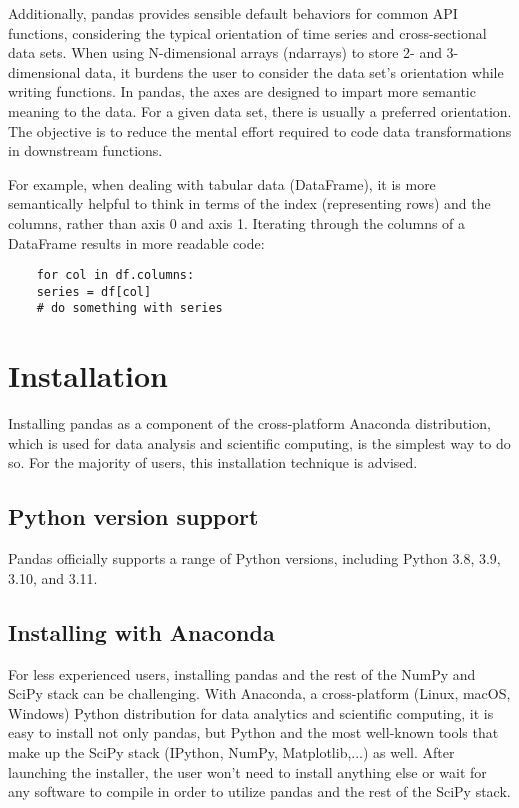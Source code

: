 Additionally, pandas provides sensible default behaviors for common API functions, considering the typical orientation of time series and cross-sectional data sets. When using N-dimensional arrays (ndarrays) to store 2- and 3-dimensional data, it burdens the user to consider the data set's orientation while writing functions. In pandas, the axes are designed to impart more semantic meaning to the data. For a given data set, there is usually a preferred orientation. The objective is to reduce the mental effort required to code data transformations in downstream functions.

For example, when dealing with tabular data (DataFrame), it is more semantically helpful to think in terms of the index (representing rows) and the columns, rather than axis 0 and axis 1. Iterating through the columns of a DataFrame results in more readable code:

\begin{verbatim}
	for col in df.columns:
	series = df[col]
	# do something with series
\end{verbatim}

\section{Installation}

Installing pandas as a component of the cross-platform Anaconda distribution, which is used for data analysis and scientific computing, is the simplest way to do so. For the majority of users, this installation technique is advised.

\subsection{Python version support}

Pandas officially supports a range of Python versions, including Python 3.8, 3.9, 3.10, and 3.11. \cite{Pandas-docs:2021}

\subsection{Installing with Anaconda}

For less experienced users, installing pandas and the rest of the NumPy and SciPy stack can be challenging.
With Anaconda, a cross-platform (Linux, macOS, Windows) Python distribution for data analytics and scientific computing, it is easy to install not only pandas, but Python and the most well-known tools that make up the SciPy stack (IPython, NumPy, Matplotlib,...) as well.
After launching the installer, the user won't need to install anything else or wait for any software to compile in order to utilize pandas and the rest of the SciPy stack.


